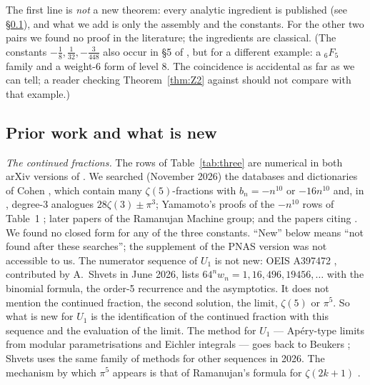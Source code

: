 \documentclass[11pt]{amsart}
\theoremstyle{definition}
\theoremstyle{remark}
\numberwithin{equation}{section}
\begin{document}
The first line is \emph{not} a new theorem: every analytic ingredient is published (see \S\ref{sec:credit}), and what we add is only the assembly and the constants. For the other two pairs we found no proof in the literature; the ingredients are classical. (The constants $-\frac18,\frac1{32},-\frac3{448}$ also occur in \S5 of \cite{Zud}, but for a different example: a ${}_6F_5$ family and a weight-6 form of level 8. The coincidence is accidental as far as we can tell; a reader checking Theorem~\ref{thm:Z2} against \cite{Zud} should not compare with that example.)

\subsection{Prior work and what is new}\label{sec:credit}
\emph{The continued fractions.} The rows of Table~\ref{tab:three} are numerical in both arXiv versions of \cite{EDCK}. We searched (November 2026) the databases and dictionaries of Cohen \cite{Coh1,Coh2,Coh3}, which contain many $\zeta(5)$-fractions with $b_n=-n^{10}$ or $-16n^{10}$ and, in \cite{Coh1}, degree-3 analogues $28\zeta(3)\pm\pi^3$; Yamamoto's proofs of the $-n^{10}$ rows of Table~1 \cite{Yam}; later papers of the Ramanujan Machine group; and the papers citing \cite{EDCK}. We found no closed form for any of the three constants. ``New'' below means ``not found after these searches''; the supplement of the PNAS version was not accessible to us.
The numerator sequence of $U_1$ is not new: OEIS A397472 \cite{OEIS}, contributed by A.~Shvets in June 2026, lists $64^nw_n=1,16,496,19456,\dots$ with the binomial formula, the order-5 recurrence and the asymptotics. It does not mention the continued fraction, the second solution, the limit, $\zeta(5)$ or $\pi^5$. So what is new for $U_1$ is the identification of the continued fraction with this sequence and the evaluation of the limit.
The method for $U_1$ --- Ap\'ery-type limits from modular parametrisations and Eichler integrals --- goes back to Beukers \cite{Beu}; Shvets \cite{Shv1,Shv2} uses the same family of methods for other sequences in 2026. The mechanism by which $\pi^5$ appears is that of Ramanujan's formula for $\zeta(2k+1)$ \cite[ch.~14, Entry~21]{Ber}.
\end{document}
